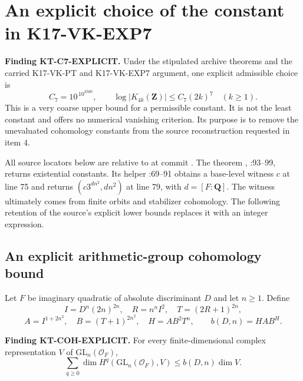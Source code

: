 \documentclass[11pt,a4paper]{article}
\theoremstyle{definition}
\renewcommand{\paragraph}[1]{\par\smallskip\noindent\textbf{#1}\quad\ignorespaces}
\begin{document}
\section{An explicit choice of the constant in K17-VK-EXP7}
\label{sec:kt-c7-explicit}

\paragraph{Finding KT-C7-EXPLICIT.}
Under the stipulated archive theorems and the carried K17-VK-PT and
K17-VK-EXP7 argument, one explicit admissible choice is
\[
 C_7=10^{\,10^{3500}},\qquad
 \log|K_{4k}(\mathbf Z)|\le C_7(2k)^7\quad(k\ge1).
\]
This is a very coarse upper bound for a permissible constant.  It is
not the least constant and offers no numerical vanishing criterion.
Its purpose is to remove the unevaluated cohomology constants from the
source reconstruction requested in item 4.

All source locators below are relative to
at commit .
The theorem ,
:93--99,
returns existential constants.  Its helper :69--91
obtains a base-level witness $c$ at line 75 and returns
$(c3^{dn^2},dn^2)$ at line 79, with $d=[F:\mathbf Q]$.
The witness ultimately comes from finite orbits and stabilizer
cohomology.  The following retention of the source's explicit lower
bounds replaces it with an integer expression.

\subsection{An explicit arithmetic-group cohomology bound}

Let $F$ be imaginary quadratic of absolute discriminant $D$ and let
$n\ge1$.  Define
\[
 I=D^n(2n)^{2n},\quad R=n^nI^2,\quad T=(2R+1)^{2n},
\]
\[
 A=I^{1+2n^2},\quad B=(T+1)^{2n^2},\quad H=AB^2T^n,
 \qquad b(D,n)=HAB^H.
\tag{KT-C7.1}
\]
\paragraph{Finding KT-COH-EXPLICIT.}
For every finite-dimensional complex representation $V$ of
$\mathrm{GL}_n(\mathcal O_F)$,
\[
 \sum_{q\ge0}\dim H^q(\mathrm{GL}_n(\mathcal O_F),V)
 \le b(D,n)\dim V.
\tag{KT-C7.2}
\]
\end{document}
